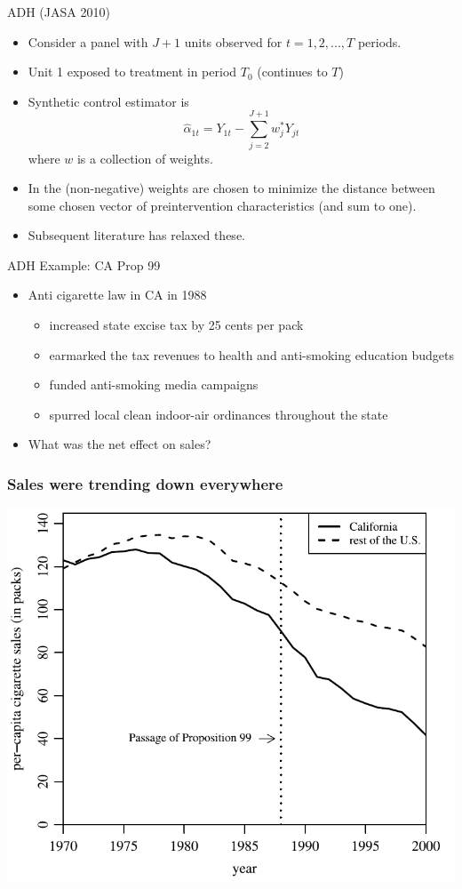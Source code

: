 \begin{frame}{ADH (JASA 2010)}
  \begin{itemize}
  \item Consider a panel with $J+1$ units observed for $t=1,2,...,T$ periods.
  \item Unit 1 exposed to treatment in period $T_0$ (continues to $T$)
  \item Synthetic control estimator is 
  $$ \hat \alpha_{1t} = Y_{1t} - \sum^{J+1}_{j=2}w_j^{*}Y_{jt} $$ where $w$ is a collection of weights. 
  \item In \cite{abadie2010synthetic} the (non-negative) weights are chosen to minimize the distance between some chosen vector of preintervention characteristics (and sum to one). 
  \item Subsequent literature has relaxed these. 
  \end{itemize}
\end{frame}

\begin{frame}{ADH Example: CA Prop 99}
  \begin{itemize}
  \item Anti cigarette law in CA in 1988
  \begin{itemize}
    \item increased state excise tax by 25 cents per pack
    \item earmarked the tax revenues to health and anti-smoking education budgets
    \item funded anti-smoking media campaigns
    \item spurred local clean indoor-air ordinances throughout the state
  \end{itemize}
  \item What was the net effect on sales?
  \end{itemize}
\end{frame}

\begin{frame}
  \frametitle{Sales were trending down everywhere}
  \begin{center}
    \includegraphics[height=.85\textheight]{./resources/ADHCAvsUS}
  \end{center}  
\end{frame}

